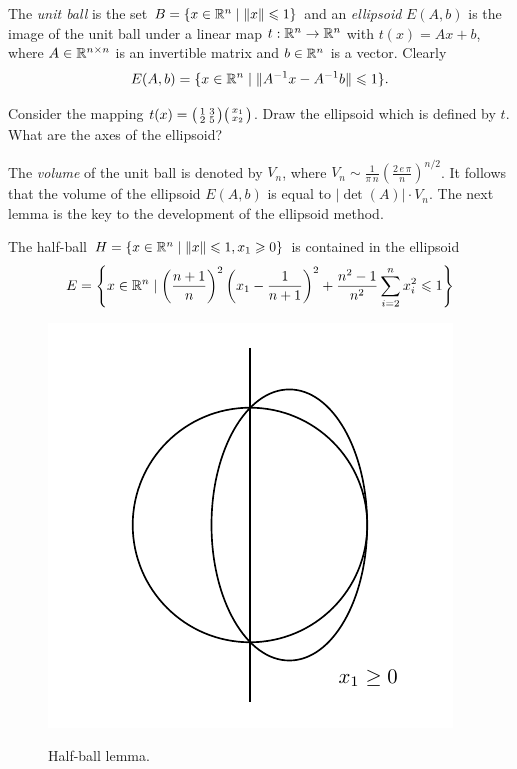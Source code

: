 The \emph{unit ball} is the set $B = \{ x \in \mathbb{R}^n \mid \|x\|\leqslant1\}$ and an
\emph{ellipsoid} $E(A,b)$ is the image of the unit ball under a linear map
$t:\mathbb{R}^n\to\mathbb{R}^n$ with $t(x) = Ax +b$, where $A \in \mathbb{R}^{n\times n}$ is an invertible
matrix and $b \in \mathbb{R}^n$ is a vector.  Clearly 
\begin{equation}
  \label{el:eq:113}
  E(A,b) =  \{ x \in \mathbb{R}^n \mid \|  A^{-1} x - A^{-1} b \| \leqslant1\}. 
\end{equation}
%



\begin{exercise}
  \label{el:ex:8}
  Consider the mapping $t(x) = \big(\begin{smallmatrix} 1 & 3 \\ 2 & 5 \end{smallmatrix}\big)
  \big(\begin{smallmatrix} x_1\\x_2 \end{smallmatrix}\big)$. Draw the ellipsoid which is defined by $t$. What
  are the axes of the ellipsoid? 
\end{exercise}


The \emph{volume} of the unit ball is denoted by $V_n$, where $V_n \sim
\frac{1}{\pi\,n} \left( \frac{2\,e\,\pi}{n}\right)^{n/2}$. It follows that
the volume of the ellipsoid $E(A,b)$ is equal to $|\det(A)| \cdot V_n$.
The next lemma is the key to the development of the ellipsoid method. 

\begin{lemma}
  \label{el:lem:12}
  The half-ball $H=\{x \in \mathbb{R}^n \mid \|x\|\leqslant1, x_1\geqslant0\}$ is contained in the
  ellipsoid 
  \begin{equation}
    \label{el:eq:13}
    E = \left\{ x \in \mathbb{R}^n \mid \left(\frac{n+1}{n}\right)^2  \left( x_1 -
      \frac{1}{n+1}\right)^2 + \frac{n^2-1}{n^2} \sum_{i=2}^n x_i^2 \leqslant1 \right\}
  \end{equation}
\end{lemma}



\begin{figure}[htbp]
  \centering 
  {
    \includegraphics{figures/ellipsoid1.pdf}
  }
  \caption{Half-ball lemma.}
  \label{el:fig:half-ball}
\end{figure}


